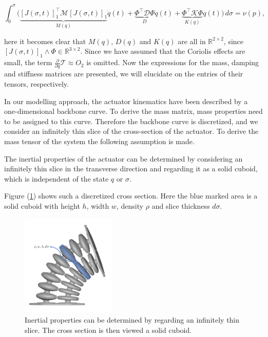 \begin{equation}
    \int_0^\sigma \Big( \underbrace{[J(\sigma,t)]_1^\top \mathcal{M} [J(\sigma,t)]_1}_{M(q)} \ddot{q}(t) +  \underbrace{\Phi^\top \mathcal{D} \Phi }_{D} \dot{q}(t)    +   \underbrace{\Phi^\top \mathcal{K} \Phi}_{K(q)} q(t)\Big) \hspace{2pt} d\sigma = \nu(p),
\end{equation}

here it becomes clear that $M(q)$, $D(q)$ and $K(q)$ are all in $\mathbb{R}^{2\times2}$, since $[J(\sigma,t)]_1 \land \Phi \in \mathbb{R}^{3 \times 2}$. Since we have assumed that the Coriolis effects are small, the term $\frac{\partial}{\partial q}\mathcal{T} \approx O_2 $ is omitted. Now the expressions for the mass, damping and stiffness matrices are presented, we will elucidate on the entries of their tensors, respectively.

In our modelling approach, the actuator kinematics have been described by a one-dimensional backbone curve. To derive the mass matrix, mass properties need to be assigned to this curve. Therefore the backbone curve is discretized, and we consider an infinitely thin slice of the cross-section of the actuator. To derive the mass tensor of the system the following assumption is made.

\begin{theorem}
The inertial properties of the actuator can be determined by considering an infinitely thin slice in the transverse direction and regarding it as a solid cuboid, which is independent of the state $q$ or $\sigma$.
\end{theorem}

Figure (\ref{fig:massapprox}) shows such a discretized cross section. Here the blue marked area is a solid cuboid with height $h$, width $w$, density $\rho$ and slice thickness $d\sigma$. 


\begin{figure}[H]
    \centering
    \includegraphics[width = 0.4\textwidth]{Figures/Chapter2/massapprox.png}
    \caption{Inertial properties can be determined by regarding an infinitely thin slice. The cross section is then viewed a solid cuboid.}
    \label{fig:massapprox}
\end{figure}



